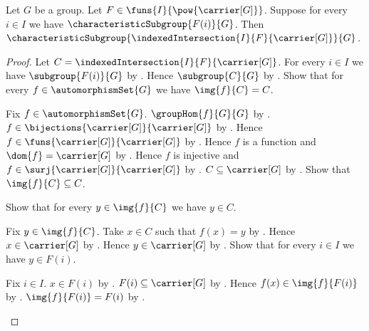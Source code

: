 \begin{theorem}\label{characteristic_subgroup_indexed_intersection}
    Let $G$ be a group.
    Let $F\in\funs{I}{\pow{\carrier[G]}}$.
    Suppose for every $i\in I$ we have
        $\characteristicSubgroup{F(i)}{G}$.
    Then
        $\characteristicSubgroup
            {\indexedIntersection{I}{F}{\carrier[G]}}{G}$.
\end{theorem}
\begin{proof}
    Let $C=\indexedIntersection{I}{F}{\carrier[G]}$.
    For every $i\in I$ we have $\subgroup{F(i)}{G}$ by
        .
    Hence $\subgroup{C}{G}$ by
        .
    Show that for every $f\in\automorphismSet{G}$ we have
        $\img{f}{C}=C$.
    \begin{subproof}
        Fix $f\in\automorphismSet{G}$.
        $\groupHom{f}{G}{G}$ by
            .
        $f\in\bijections{\carrier[G]}{\carrier[G]}$ by
            .
        Hence $f\in\funs{\carrier[G]}{\carrier[G]}$ by
            .
        Hence $f$ is a function and $\dom{f}=\carrier[G]$ by
            .
        Hence $f$ is injective and
            $f\in\surj{\carrier[G]}{\carrier[G]}$ by
            .
        $C\subseteq\carrier[G]$ by
            .
        Show that $\img{f}{C}\subseteq C$.
        \begin{subproof}
            Show that for every $y\in\img{f}{C}$ we have $y\in C$.
            \begin{subproof}
                Fix $y\in\img{f}{C}$.
                Take $x\in C$ such that $f(x)=y$ by
                    .
                Hence $x\in\carrier[G]$ by .
                Hence $y\in\carrier[G]$ by
                    .
                Show that for every $i\in I$ we have $y\in F(i)$.
                \begin{subproof}
                    Fix $i\in I$.
                    $x\in F(i)$ by
                        .
                    $F(i)\subseteq\carrier[G]$ by
                        .
                    Hence $f(x)\in\img{f}{F(i)}$ by
                        .
                    $\img{f}{F(i)}=F(i)$ by
                        .
                \end{subproof}

\end{subproof}
\end{subproof}
\end{subproof}
\end{proof}
